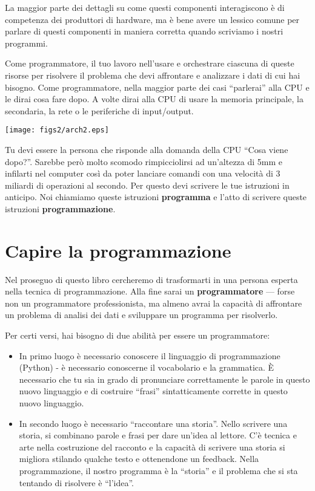 La maggior parte dei dettagli su come questi componenti interagiscono \`{e} di competenza dei produttori di hardware, ma \`{e} bene avere un lessico comune per parlare di questi componenti in maniera corretta quando scriviamo i nostri programmi.


Come programmatore, il tuo lavoro nell'usare e orchestrare ciascuna di queste risorse per risolvere il problema che devi affrontare e analizzare i dati di cui hai bisogno. Come programmatore, nella maggior parte dei casi {``}parlerai'' alla CPU e le dirai cosa fare dopo. A volte dirai alla CPU di usare la memoria principale, la secondaria, la rete o le periferiche di input/output.



\beforefig
\centerline{\texttt{[image: figs2/arch2.eps]}}
\afterfig

Tu devi essere la persona che risponde alla domanda della CPU {``}Cosa viene dopo?''. Sarebbe per\`{o} molto scomodo rimpicciolirsi ad un'altezza di 5mm e infilarti nel computer cos\`{i} da poter lanciare comandi con una velocit\`{a} di 3 miliardi di operazioni al secondo. Per questo devi scrivere le tue istruzioni in anticipo. Noi chiamiamo queste istruzioni \textbf{programma }e l'atto di scrivere queste istruzioni \textbf{programmazione}.

\section{Capire la programmazione}

Nel proseguo di questo libro cercheremo di trasformarti in una persona esperta nella tecnica di programmazione. Alla fine sarai un \textbf{programmatore }--- forse non un programmatore professionista, ma almeno avrai la capacit\`{a} di affrontare un problema di analisi dei dati e sviluppare un programma per risolverlo.


Per certi versi, hai bisogno di due abilit\`{a} per essere un programmatore:

\begin{itemize}

\item In primo luogo \`{e} necessario conoscere il linguaggio di programmazione (Python) - \`{e} necessario conoscerne il vocabolario e la grammatica. \`{E} necessario che tu sia in grado di pronunciare correttamente le parole in questo nuovo linguaggio e di costruire {``}frasi'' sintatticamente corrette in questo nuovo linguaggio.


\item In secondo luogo \`{e} necessario {``}raccontare una storia''. Nello scrivere una storia, si combinano parole e frasi per dare un'idea al lettore. C'\`{e} tecnica e arte nella costruzione del racconto e la capacit\`{a} di scrivere una storia si migliora stilando qualche testo e ottenendone un feedback. Nella programmazione, il nostro programma \`{e} la {``}storia'' e il problema che si sta tentando di risolvere \`{e} {``}l'idea''.

\end{itemize}

